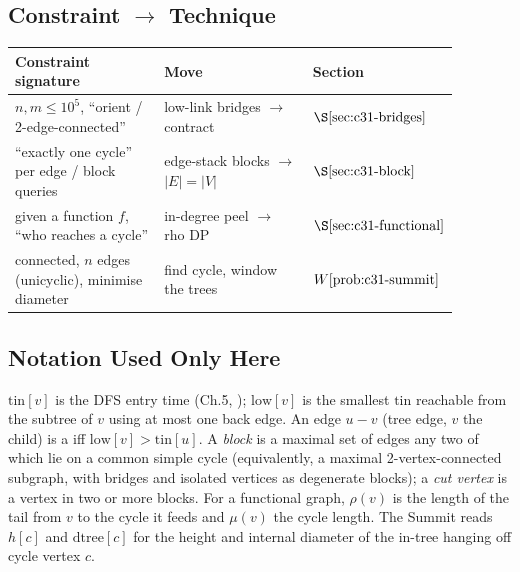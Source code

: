 \subsection*{Constraint \(\to\) Technique}

\begin{center}
\renewcommand{\arraystretch}{1.2}
\setlength{\tabcolsep}{3pt}
\begin{tabular}{@{}p{0.34\linewidth} p{0.34\linewidth} >{\raggedright\arraybackslash}p{0.20\linewidth}@{}}
\toprule
\textbf{Constraint signature} & \textbf{Move} & \textbf{Section}\\
\midrule
\(n,m\le10^5\), ``orient / 2-edge-connected'' & low-link bridges \(\to\) contract & \(\secref{c31-bridges}\)\\
``exactly one cycle'' per edge / block queries & edge-stack blocks \(\to\) \(|E|=|V|\) & \(\secref{c31-block}\)\\
given a function \(f\), ``who reaches a cycle'' & in-degree peel \(\to\) rho DP & \(\secref{c31-functional}\)\\
connected, \(n\) edges (unicyclic), minimise diameter & find cycle, window the trees & \(\probref{c31-summit}\)\\
\bottomrule
\end{tabular}
\end{center}

\subsection*{Notation Used Only Here}

\(\mathrm{tin}[v]\) is the DFS entry time (Ch.5, );
\(\mathrm{low}[v]\) is the smallest \(\mathrm{tin}\) reachable from the subtree of
\(v\) using at most one back edge.  An edge \(u\!-\!v\) (tree edge, \(v\) the
child) is a  iff \(\mathrm{low}[v]>\mathrm{tin}[u]\).  A
\emph{block} is a maximal set of edges any two of which lie on a common simple
cycle (equivalently, a maximal 2-vertex-connected subgraph, with bridges and
isolated vertices as degenerate blocks); a \emph{cut vertex} is a vertex in two or
more blocks.  For a functional graph, \(\rho(v)\) is the length of the tail from
\(v\) to the cycle it feeds and \(\mu(v)\) the cycle length.  The Summit reads
\(h[c]\) and \(\mathrm{dtree}[c]\) for the height and internal diameter of the
in-tree hanging off cycle vertex \(c\).
